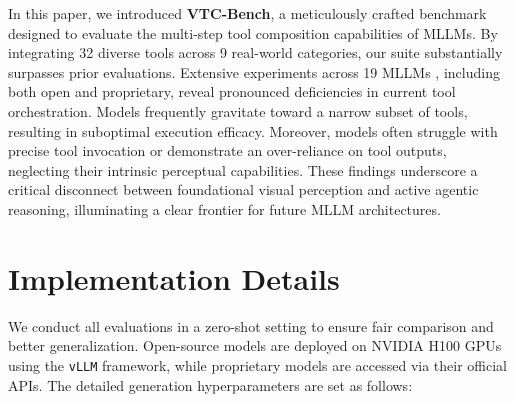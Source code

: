 \documentclass[runningheads]{llncs}
\newcommand{\benchname}{VTC-Bench\xspace}
\begin{document}
In this paper, we introduced \textbf{\benchname}, a meticulously crafted benchmark designed to evaluate the multi-step tool composition capabilities of MLLMs. 
By integrating 32 diverse tools across 9 real-world categories, our suite substantially surpasses prior evaluations. 
Extensive experiments across 19 MLLMs , including both open and proprietary, reveal pronounced deficiencies in current tool orchestration. 
Models frequently gravitate toward a narrow subset of tools, resulting in suboptimal execution efficacy. Moreover, models often struggle with precise tool invocation or demonstrate an over-reliance on tool outputs, neglecting their intrinsic perceptual capabilities. 
These findings underscore a critical disconnect between foundational visual perception and active agentic reasoning, illuminating a clear frontier for future MLLM architectures.


%
%



\newpage
\appendix

\onecolumn

\section{Implementation Details}
We conduct all evaluations in a zero-shot setting to ensure fair comparison and better generalization. Open-source models are deployed on NVIDIA H100 GPUs using the \texttt{vLLM} framework, while proprietary models are accessed via their official APIs. The detailed generation hyperparameters are set as follows:
\end{document}
